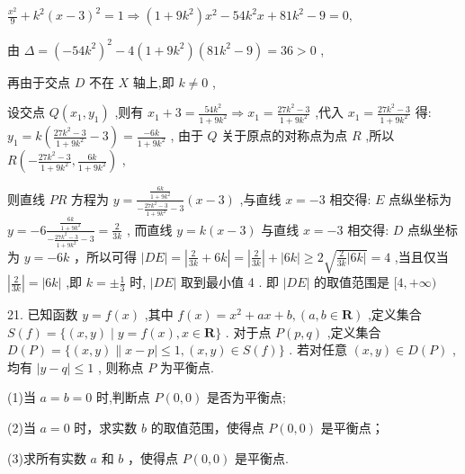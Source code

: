 \documentclass[10pt]{article}
\begin{document}
\(\frac{{x}^{2}}{9} + {k}^{2}{\left( x - 3\right) }^{2} = 1 \Rightarrow  \left( {1 + 9{k}^{2}}\right) {x}^{2} - {54}{k}^{2}x + {81}{k}^{2} - 9 = 0,\)

由 \(\Delta  = {\left( -{54}{k}^{2}\right) }^{2} - 4\left( {1 + 9{k}^{2}}\right) \left( {{81}{k}^{2} - 9}\right)  = {36} > 0\) ,

再由于交点 \(D\) 不在 \(X\) 轴上,即 \(k \neq  0\) ,

设交点 \(Q\left( {{x}_{1},{y}_{1}}\right)\) ,则有 \({x}_{1} + 3 = \frac{{54}{k}^{2}}{1 + 9{k}^{2}} \Rightarrow  {x}_{1} = \frac{{27}{k}^{2} - 3}{1 + 9{k}^{2}}\) ,代入 \({x}_{1} = \frac{{27}{k}^{2} - 3}{1 + 9{k}^{2}}\) 得: \({y}_{1} = k\left( {\frac{{27}{k}^{2} - 3}{1 + 9{k}^{2}} - 3}\right)  = \frac{-{6k}}{1 + 9{k}^{2}}\) , 由于 \(Q\) 关于原点的对称点为点 \(R\) ,所以 \(R\left( {-\frac{{27}{k}^{2} - 3}{1 + 9{k}^{2}},\frac{6k}{1 + 9{k}^{2}}}\right)\) ,

则直线 \({PR}\) 方程为 \(y = \frac{\frac{6k}{1 + 9{k}^{2}}}{-\frac{{27}{k}^{2} - 3}{1 + 9{k}^{2}} - 3}\left( {x - 3}\right)\) ,与直线 \(x =  - 3\) 相交得: \(E\) 点纵坐标为 \(y =  - 6\frac{\frac{6k}{1 + 9{k}^{2}}}{-\frac{{27}{k}^{2} - 3}{1 + 9{k}^{2}} - 3} = \frac{2}{3k}\) , 而直线 \(y = k\left( {x - 3}\right)\) 与直线 \(x =  - 3\) 相交得: \(D\) 点纵坐标为 \(y =  - {6k}\) ，所以可得 \(\left| {DE}\right|  = \left| {\frac{2}{3k} + {6k}}\right|  = \left| \frac{2}{3k}\right|  + \left| {6k}\right|  \geq  2\sqrt{\frac{2}{3k}\left| {6k}\right| } = 4\) ,当且仅当 \(\left| \frac{2}{3k}\right|  = \left| {6k}\right|\) ,即 \(k =  \pm  \frac{1}{3}\) 时, \(\left| {DE}\right|\) 取到最小值 4 . 即 \(\left| {DE}\right|\) 的取值范围是 \(\lbrack 4, + \infty )\)

21. 已知函数 \(y = f\left( x\right)\) ,其中 \(f\left( x\right)  = {x}^{2} + {ax} + b,\left( {a,b \in  \mathbf{R}}\right)\) ,定义集合 \(S\left( f\right)  = \{ \left( {x,y}\right)  \mid  y = f\left( x\right) ,x \in  \mathbf{R}\}\) . 对于点 \(P\left( {p,q}\right)\) ,定义集合 \(D\left( P\right)  = \{ \left( {x,y}\right) \parallel x - p \mid   \leq  1,\left( {x,y}\right)  \in  S\left( f\right) \}\) . 若对任意 \(\left( {x,y}\right)  \in  D\left( P\right)\) ,均有 \(\left| {y - q}\right|  \leq  1\) , 则称点 \(P\) 为平衡点.

(1)当 \(a = b = 0\) 时,判断点 \(P\left( {0,0}\right)\) 是否为平衡点;

(2)当 \(a = 0\) 时，求实数 \(b\) 的取值范围，使得点 \(P\left( {0,0}\right)\) 是平衡点；

(3)求所有实数 \(a\) 和 \(b\) ，使得点 \(P\left( {0,0}\right)\) 是平衡点.
\end{document}
